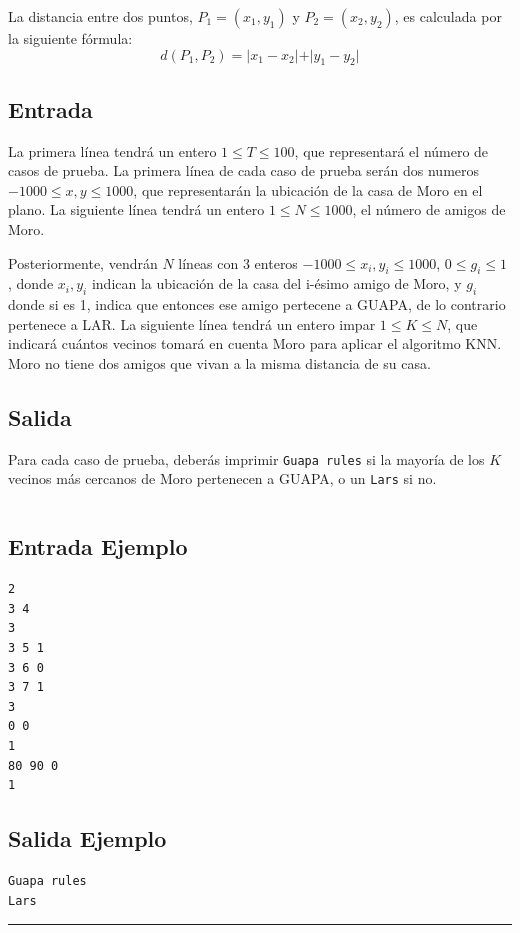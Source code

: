 La distancia entre dos puntos, $P_1=(x_1,y_1)$ y $P_2=(x_2,y_2)$, es calculada por la siguiente fórmula:
$$ d(P_1, P_2) = \vert x_1-x_2\vert + \vert y_1-y_2\vert$$

\subsection*{Entrada}
La primera línea tendrá un entero $1 \leq T \leq 100$, que representará el número de casos de prueba. La primera línea de cada caso de prueba serán dos numeros $-1000 \leq x,y \leq 1000$, que representarán la ubicación de la casa de Moro en el plano. La siguiente línea tendrá un entero $1 \leq N \leq 1000$, el número de amigos de Moro.

Posteriormente, vendrán $N$ líneas con $3$ enteros $-1000 \leq x_i,y_i \leq 1000$, $0 \leq g_i \leq 1$ , donde $ x_i,y_i$ indican la ubicación de la casa del i-ésimo amigo de Moro, y $g_i$ donde si es 1, indica que entonces ese amigo pertecene a GUAPA, de lo contrario pertenece a LAR. La siguiente línea tendrá un entero impar $1\leq K\leq N$, que indicará cuántos vecinos tomará en cuenta Moro para aplicar el algoritmo KNN. Moro no tiene dos amigos que vivan a la misma distancia de su casa. 

\subsection*{Salida}
Para cada caso de prueba, deberás imprimir \texttt{Guapa rules} si la mayoría de los $K$ vecinos más cercanos de Moro pertenecen a GUAPA, o un \texttt{Lars} si no.

\newpage
$$$$
$$$$
$$$$

\begin{multicols}{2}
\subsection*{Entrada Ejemplo}
\begin{verbatim}
2
3 4
3
3 5 1
3 6 0
3 7 1
3
0 0
1
80 90 0
1
\end{verbatim}

\columnbreak
\subsection*{Salida Ejemplo}
\begin{verbatim}
Guapa rules
Lars
\end{verbatim}
\end{multicols}

\noindent \rule[0.5ex]{1\columnwidth}{1pt}


